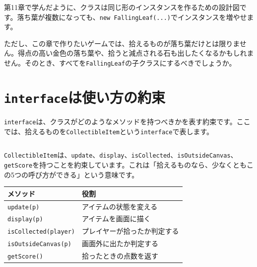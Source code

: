 \begin{listing}[htbp]
\inputminted[firstline=32,lastline=57]{ts}{typescript-p5/listings/chapter19/leaf-class.ts}
\caption{\texttt{FallingLeaf}の更新と描画（\texttt{chapter19/leaf-class.ts}）}
\label{lst:chapter19-leaf-class-methods}
\end{listing}

\begin{listing}[htbp]
\inputminted[firstline=60,lastline=73]{ts}{typescript-p5/listings/chapter19/leaf-class.ts}
\caption{\texttt{FallingLeaf}を使うスケッチ（\texttt{chapter19/leaf-class.ts}）}
\label{lst:chapter19-leaf-class-sketch}
\end{listing}

第11章で学んだように、クラスは同じ形のインスタンスを作るための設計図です。落ち葉が複数になっても、\texttt{new FallingLeaf(...)}でインスタンスを増やせます。

ただし、この章で作りたいゲームでは、拾えるものが落ち葉だけとは限りません。得点の高い金色の落ち葉や、拾うと減点される石も出したくなるかもしれません。そのとき、すべてを\texttt{FallingLeaf}の子クラスにするべきでしょうか。

\section{\texttt{interface}は使い方の約束}

\texttt{interface}は、クラスがどのようなメソッドを持つべきかを表す約束です。ここでは、拾えるものを\texttt{CollectibleItem}という\texttt{interface}で表します。

\begin{listing}[htbp]
\inputminted[firstline=1,lastline=8]{ts}{typescript-p5/listings/chapter19/collectible-interface.ts}
\caption{拾えるものに必要なメソッドを表す\texttt{interface}（\texttt{chapter19/collectible-interface.ts}）}
\label{lst:chapter19-collectible-interface}
\end{listing}

\texttt{CollectibleItem}は、\texttt{update}、\texttt{display}、\texttt{isCollected}、\texttt{isOutsideCanvas}、\texttt{getScore}を持つことを約束しています。これは「拾えるものなら、少なくともこの5つの呼び方ができる」という意味です。

\begin{center}
\begin{tabular}{ll}
\toprule
メソッド & 役割 \\
\midrule
\texttt{update(p)} & アイテムの状態を変える \\
\texttt{display(p)} & アイテムを画面に描く \\
\texttt{isCollected(player)} & プレイヤーが拾ったか判定する \\
\texttt{isOutsideCanvas(p)} & 画面外に出たか判定する \\
\texttt{getScore()} & 拾ったときの点数を返す \\
\bottomrule
\end{tabular}
\end{center}

